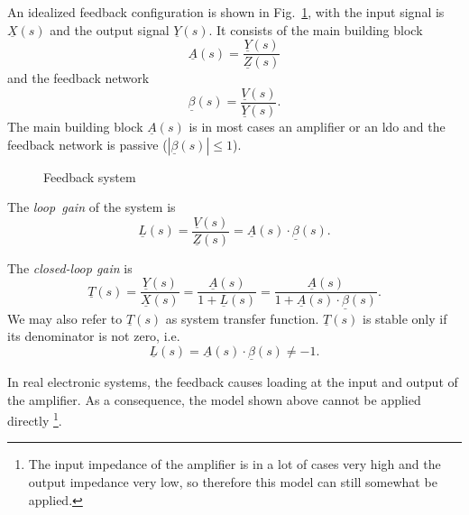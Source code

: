 \documentclass{article}[11pt]
\begin{document}
\notetitle

An idealized feedback configuration is shown in Fig.~\ref{fig:fs},
with the input signal is $\underline{X}(s)$ and the output signal
$\underline{Y}(s)$.
It consists of the main building block
\begin{equation}
\underline{A}(s) = \frac{\underline{Y}(s)}{\underline{Z}(s)}
\end{equation}
and the feedback network
\begin{equation}
\underline{\beta}(s) = \frac{\underline{V}(s)}{\underline{Y}(s)}.
\end{equation}
The main building block $\underline{A}(s)$ is in most cases an amplifier or 
an \gls{ldo} and the feedback network is 
passive ($|\underline{\beta}(s)|\leq1$).
\begin{figure}[H]
  \centering
  \begin{tikzpicture}
    
  \end{tikzpicture}
  \caption{Feedback system}
  \label{fig:fs}
\end{figure}

The \textit{loop~gain} of the system is 
\begin{equation}
\underline{L}(s) = \frac{\underline{V}(s)}{\underline{Z}(s)} 
                 = \underline{A}(s) \cdot \underline{\beta}(s).
\end{equation}

The \textit{closed-loop gain} is
\begin{equation}\label{eq:fs}
\underline{T}(s) = \frac{\underline{Y}(s)}{\underline{X}(s)} 
                 = \frac{\underline{A}(s)}{1+\underline{L}(s)}
                 = \frac{\underline{A}(s)}{1+\underline{A}(s) \cdot \underline{\beta}(s)}.
\end{equation}
We may also refer to $\underline{T}(s)$ as system transfer function.
$\underline{T}(s)$ is stable only if its denominator is not zero, i.e. 
\begin{equation}
\underline{L}(s) = \underline{A}(s) \cdot \underline{\beta}(s) \neq -1.
\end{equation}

In real electronic systems, the feedback causes loading at the input and output 
of the amplifier.
As a consequence, the model shown above cannot be applied directly%
\footnote{The input impedance of the amplifier is in a lot of cases very high
and the output impedance very low, so therefore this model can still somewhat 
be applied.}.
\end{document}
